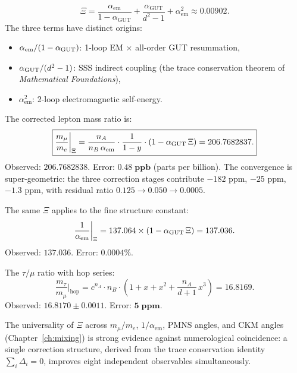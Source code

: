 \begin{definition}
\begin{equation}
\Xi = \frac{\alpha_\mathrm{em}}{1 - \alpha_\mathrm{GUT}} + \frac{\alpha_\mathrm{GUT}}{d^2 - 1} + \alpha_\mathrm{em}^2 \approx 0.00902.
\end{equation}
The three terms have distinct origins:
\begin{itemize}
\item $\alpha_\mathrm{em}/(1 - \alpha_{\mathrm{GUT}})$: 1-loop EM $\times$ all-order GUT resummation,
\item $\alpha_{\mathrm{GUT}}/(d^2 - 1)$: SSS indirect coupling (the trace conservation theorem of \textit{Mathematical Foundations}),
\item $\alpha_\mathrm{em}^2$: 2-loop electromagnetic self-energy.
\end{itemize}
\end{definition}

The corrected lepton mass ratio is:
\begin{equation}
\boxed{\frac{m_\mu}{m_e}\bigg|_{\Xi} = \frac{n_A}{n_B\,\alpha_\mathrm{em}} \cdot \frac{1}{1 - y} \cdot (1 - \alpha_{\mathrm{GUT}}\,\Xi) = 206.7682837.}
\end{equation}
Observed: $206.7682838$.  Error: $\mathbf{0.48\;\text{ppb}}$ (parts per billion).  The convergence is super-geometric: the three correction stages contribute $-182$ ppm, $-25$ ppm, $-1.3$ ppm, with residual ratio $0.125 \to 0.050 \to 0.0005$.

The same $\Xi$ applies to the fine structure constant:
\begin{equation}
\frac{1}{\alpha_\mathrm{em}}\bigg|_{\Xi} = 137.064 \times (1 - \alpha_{\mathrm{GUT}}\,\Xi) = 137.036.
\end{equation}
Observed: $137.036$.  Error: $\mathbf{0.0004\%}$.

The $\tau/\mu$ ratio with hop series:
\begin{equation}
\frac{m_\tau}{m_\mu}\bigg|_{\text{hop}} = c^{n_A}\cdot n_B \cdot \left(1 + x + x^2 + \frac{n_A}{d+1}\,x^3\right) = 16.8169.
\end{equation}
Observed: $16.8170 \pm 0.0011$.  Error: $\mathbf{5\;\text{ppm}}$.

\begin{remark}
The universality of $\Xi$ across $m_\mu/m_e$, $1/\alpha_\mathrm{em}$, PMNS angles, and CKM angles (Chapter~\ref{ch:mixing}) is strong evidence against numerological coincidence: a single correction structure, derived from the trace conservation identity $\sum_i \Delta_i = 0$, improves eight independent observables simultaneously.
\end{remark}

